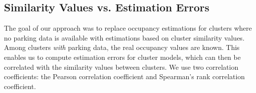 
\subsection{Similarity Values vs. Estimation Errors}
\label{evaluation:similarity_vs_estimation_sec}
The goal of our approach was to replace occupancy estimations for clusters where no parking data is available with estimations based on cluster similarity values.
Among clusters \textit{with} parking data, the real occupancy values are known.
This enables us to compute estimation errors for cluster models, which can then be correlated with the similarity values between clusters.
We use two correlation coefficients: the Pearson correlation coefficient and Spearman's rank correlation coefficient.

